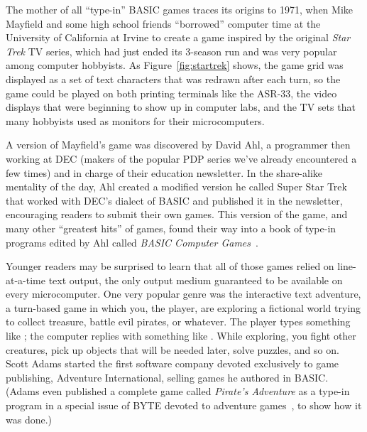 The mother of all ``type-in'' BASIC games traces its origins to 1971,
when Mike Mayfield and some high school friends ``borrowed'' computer
time at the University of California at Irvine to create a game
inspired by the original \emph{Star Trek} TV series, which had just
ended its 3-season run and was very popular among computer hobbyists.
As Figure~\ref{fig:startrek} shows, the game grid was displayed as a
set of text characters that was redrawn after each turn, so the game
could be played on both printing terminals like the ASR-33, the video
displays that were beginning to show up in computer labs, and the TV
sets that many hobbyists used as monitors for their microcomputers.

A version of Mayfield's game was discovered by David Ahl, a programmer
then working at DEC (makers of the popular PDP series we've already
encountered a few times) and in charge of their education newsletter.
In the share-alike mentality of the day, Ahl created a modified
version he called Super Star Trek that worked with DEC's dialect of
BASIC and published it in the newsletter, encouraging readers to
submit their own games.
This version of the game, and many other ``greatest hits'' of games,
found their way into a book of type-in programs edited by Ahl called
\emph{BASIC Computer Games}~\cite{basic_computer_games}.


Younger readers may be surprised to learn that all of those games
relied on line-at-a-time text output, the only output medium
guaranteed to be available on every microcomputer.
One very popular genre was the interactive text adventure, a
turn-based game in which you, the player, are exploring a fictional
world trying to collect treasure, battle evil pirates, or whatever.
The player types something like ; the computer replies
with something like .
While exploring, you fight other creatures, pick up objects that
will be needed later, solve puzzles, and so on.
Scott Adams started the first software company devoted exclusively to
game publishing, Adventure International, selling games he authored in
BASIC.
(Adams even published a complete game called \emph{Pirate's Adventure}
as a type-in program in a special issue of BYTE devoted to adventure
games~\cite{byte80:adventure}, to show how it was done.)

